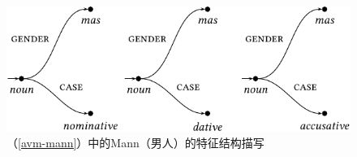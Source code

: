 \begin{figure}
\centerline{%
\includegraphics{Figures/mann-model-theoretic-crop}
}
\caption{\label{abb-avm-mann}（\ref{avm-mann}）中的Mann（男人）的特征结构描写}
\end{figure}%
